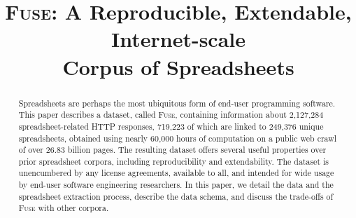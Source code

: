 \documentclass[conference]{IEEEtran}
\begin{document}
%
\title{\textsc{Fuse}: A Reproducible, Extendable, Internet-scale\\Corpus of Spreadsheets}

\author{
}

\maketitle

\begin{abstract}
Spreadsheets are perhaps the most ubiquitous form of end-user programming software. This paper describes a dataset, called \textsc{Fuse}, containing information about 2,127,284 spreadsheet-related HTTP responses, 
719,223 of which are linked to 249,376 unique spreadsheets, obtained using nearly 60,000 hours of computation on a public web crawl of over 26.83 billion pages. The resulting dataset offers several useful properties over prior spreadsheet corpora, including reproducibility and extendability. The dataset is unencumbered by any license agreements, available to all, and intended for wide usage by end-user software engineering researchers. In this paper, we detail the data and the spreadsheet extraction process, describe the data schema, and discuss the trade-offs of \textsc{Fuse} with other corpora.
\end{abstract}


\IEEEpeerreviewmaketitle


\end{document}
